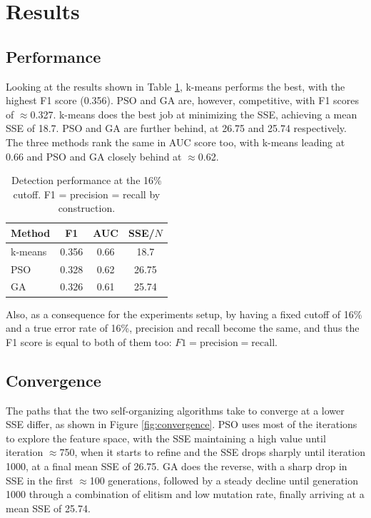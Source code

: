 \documentclass[11pt,a4paper]{article}
\begin{document}
\section{Results}

\subsection{Performance}

Looking at the results shown in Table \ref{tab:results}, k-means performs the best, with the highest F1 score (0.356). PSO and GA are, however, competitive, with F1 scores of $\approx$0.327. k-means does the best job at minimizing the SSE, achieving a mean SSE of 18.7. PSO and GA are further behind, at 26.75 and 25.74 respectively. The three methods rank the same in AUC score too, with k-means leading at 0.66 and PSO and GA closely behind at $\approx$0.62.

\begin{table}[H]
\centering
\begin{tabular}{lccc}
\toprule
Method & F1 & AUC & SSE/$N$ \\
\midrule
k-means & 0.356 & 0.66 & 18.7 \\
PSO     & 0.328 & 0.62 & 26.75 \\
GA      & 0.326 & 0.61 & 25.74 \\
\bottomrule
\end{tabular}
\caption{Detection performance at the 16\% cutoff. F1 = precision = recall by construction.}
\label{tab:results}
\end{table}

Also, as a consequence for the experiments setup, by having a fixed cutoff of 16\% and a true error rate of 16\%, precision and recall become the same, and thus the F1 score is equal to both of them too:
$F1 = \text{precision} = \text{recall}$. 

\subsection{Convergence}

The paths that the two self-organizing algorithms take to converge at a lower SSE differ, as shown in Figure \ref{fig:convergence}. PSO uses most of the iterations to explore the feature space, with the SSE maintaining a high value until iteration $\approx$750, when it starts to refine and the SSE drops sharply until iteration 1000, at a final mean SSE of 26.75. GA does the reverse, with a sharp drop in SSE in the first $\approx$100 generations, followed by a steady decline until generation 1000 through a combination of elitism and low mutation rate, finally arriving at a mean SSE of 25.74.
\end{document}
